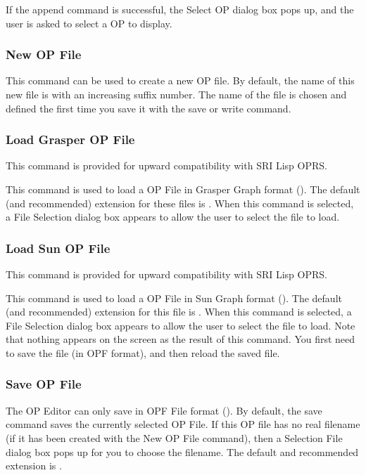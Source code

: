 If the append command is successful, the Select OP dialog box pops up,
and the user is asked to select a OP to display.

\subsubsection{New OP File}

This command can be used to create a new OP file. By default, the name of
this new file is  with an increasing suffix number. The
name of the file is chosen and defined the first time you save
it with the save or write command.

\subsubsection{Load Grasper OP File}

This command is provided for upward compatibility with SRI Lisp OPRS.

This command is used to load a OP File in Grasper Graph format
(). The default (and recommended) extension for these
files is  . When this command is selected, a File Selection
dialog box appears to allow the user to select the file to load.

\subsubsection{Load Sun OP File}

This command is provided for upward compatibility with SRI Lisp OPRS.

This command is used to load a OP File in Sun Graph format
(). The default (and recommended) extension for this
file is . When this command is selected, a File Selection
dialog box appears to allow the user to select the file to load. Note that
nothing appears on the screen as the result of this command. You first need
to save the file (in OPF format), and then reload the saved file.

\subsubsection{Save OP File}

The OP Editor can only save in OPF File format (). By
default, the save command saves the currently selected OP File. If this
OP file has no real filename (if it has been created with the New OP File
command), then a Selection File dialog box pops up for you to choose the
filename. The default and recommended extension is .

